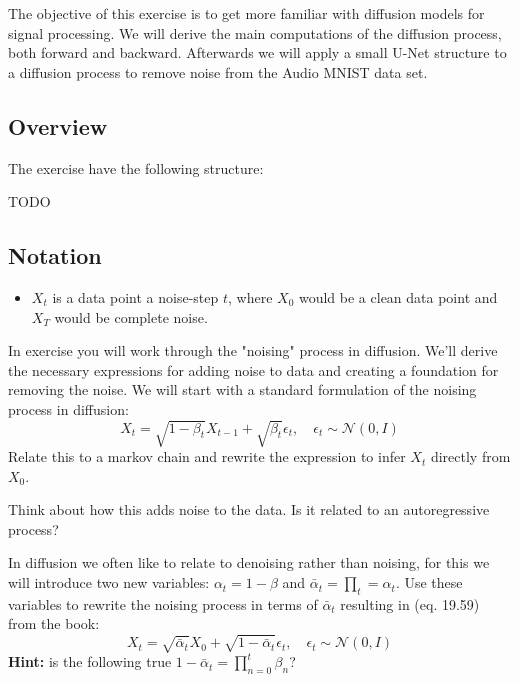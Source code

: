 \documentclass[12pt]{article}    %
\begin{document}


The objective of this exercise is to get more familiar with diffusion models for signal processing. We will derive the main computations of the diffusion process, both forward and backward.
Afterwards we will apply a small U-Net structure to a diffusion process to remove noise from the Audio MNIST data set.

\subsection*{Overview}
The exercise have the following structure:

TODO

\subsection*{Notation}
\begin{itemize} 
  \item $X_t$ is a data point a noise-step $t$, where $X_0$ would be a clean data point and $X_T$ would be complete noise.
\end{itemize}


In exercise you will work through the "noising" process in diffusion. 
We'll derive the necessary expressions for adding noise to data and creating a foundation for removing the noise.
\exminor
We will start with a standard formulation of the noising process in diffusion:
\begin{equation} \label{eq:basic-diffusion}
    X_t = \sqrt{1-\beta_t} X_{t-1} + \sqrt{\beta_t} \epsilon_t, \quad \epsilon_t \sim \mathcal{N}(0,I)
\end{equation} 
Relate this to a markov chain and rewrite the expression to infer $X_t$ directly from $X_0$.

Think about how this adds noise to the data. Is it related to an autoregressive process?

\exminorhard
In diffusion we often like to relate to denoising rather than noising, for this we will introduce two new variables: $\alpha_t = 1 - \beta$ and $\bar{\alpha}_t = \prod_t = \alpha_t$.
Use these variables to rewrite the noising process in terms of $\bar{\alpha}_t$ resulting in (eq. 19.59) from the book:
\begin{equation} \label{eq:forward-process}
    X_t = \sqrt{\bar{\alpha}_t}X_0+\sqrt{1-\bar{\alpha}_t} \epsilon_t, \quad \epsilon_t \sim \mathcal{N}(0,I)
\end{equation}
\textbf{Hint:} is the following true $1-\bar{\alpha}_t = \prod_{n=0}^{t} \beta_n$?
\end{document}
